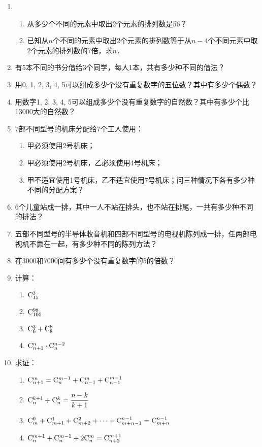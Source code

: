 \begin{enumerate}
\item \begin{enumerate}[(1)]
    \item 从多少个不同的元素中取出2个元素的排列数是56？
    \item 已知从$n$个不同的元素中取出2个元素的排列数等于从$n-4$个不同元素中取2个元素的排列数的7倍，求$n$．
\end{enumerate}
\item 有5本不同的书分借给3个同学，每人1本，共有多少种不同的借法？
\item 用0, 1, 2, 3, 4, 5可以组成多少个没有重复数字的五位数？其中有多少个偶数？
\item 用数字1, 2, 3, 4, 5可以组成多少个没有重复数字的自然数？其中有多少个比13000大的自然数？
\item 7部不同型号的机床分配给7个工人使用：
\begin{enumerate}[(1)]
\item 甲必须使用2号机床；
\item 甲必须使用2号机床，乙必须使用4号机床；
\item 甲不适宜使用1号机床，乙不适宜使用7号机床；问三种情况下各有多少种不同的分配方案？
\end{enumerate}

\item 6个儿童站成一排，其中一人不站在排头，也不站在排尾，一共有多少种不同的排法？
\item 五部不同型号的半导体收音机和四部不同型号的电视机陈列成一排，任两部电视机不靠在一起，有多少种不同的陈列方法？
\item 在3000和7000间有多少个没有重复数字的5的倍数？

\item 计算：
\begin{multicols}{2}
\begin{enumerate}[(1)]
    \item ${\rm C}^{3}_{15}$
    \item ${\rm C}^{98}_{100}$
    \item ${\rm C}^{3}_{6}+{\rm C}^{6}_{8}$
    \item ${\rm C}^{n}_{n+1}\cdot {\rm C}^{n-2}_{n}$
\end{enumerate}
\end{multicols}

\item 求证：
\begin{enumerate}[(1)]
    \item ${\rm C}^{m}_{n+1}={\rm C}^{m-1}_{n}+{\rm C}^{m}_{n-1}+{\rm C}^{m-1}_{n-1}$
    \item ${\rm C}^{k+1}_{n}\div {\rm C}^{k}_{n}=\dfrac{n-k}{k+1}$
    \item ${\rm C}^{0}_{m}+{\rm C}^{1}_{m+1}+{\rm C}^{2}_{m+2}+\cdots+{\rm C}^{n-1}_{m+n-1}={\rm C}^{n-1}_{m+n}$
    \item ${\rm C}^{m+1}_{n}+{\rm C}^{m-1}_{n}+2{\rm C}^{m}_{n}={\rm C}^{m+1}_{n+2}$
\end{enumerate}


\end{enumerate}
